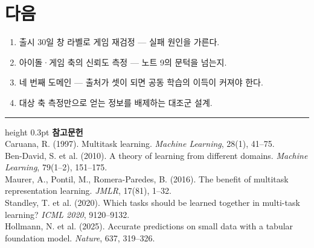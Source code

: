 \documentclass[10pt]{article}
\begin{document}
\section{다음}

\begin{enumerate}[leftmargin=1.3em,itemsep=0.15em]
\item 출시 30일 창 라벨로 게임 재검정 --- 실패 원인을 가른다.
\item 아이돌·게임 축의 신뢰도 측정 --- 노트 9의 문턱을 넘는지.
\item 네 번째 도메인 --- 출처가 셋이 되면 공동 학습의 이득이 커져야 한다.
\item 대상 축 측정만으로 얻는 정보를 배제하는 대조군 설계.
\end{enumerate}

\vspace{0.6em}
\hrule height 0.3pt
\vspace{0.5em}
{\footnotesize
\textbf{참고문헌}\\[0.3em]
Caruana, R. (1997). Multitask learning. \emph{Machine Learning}, 28(1), 41--75.\\[0.15em]
Ben-David, S. et al. (2010). A theory of learning from different domains.
\emph{Machine Learning}, 79(1--2), 151--175.\\[0.15em]
Maurer, A., Pontil, M., Romera-Paredes, B. (2016). The benefit of multitask
representation learning. \emph{JMLR}, 17(81), 1--32.\\[0.15em]
Standley, T. et al. (2020). Which tasks should be learned together in multi-task
learning? \emph{ICML 2020}, 9120--9132.\\[0.15em]
Hollmann, N. et al. (2025). Accurate predictions on small data with a tabular
foundation model. \emph{Nature}, 637, 319--326.
}
\end{document}
